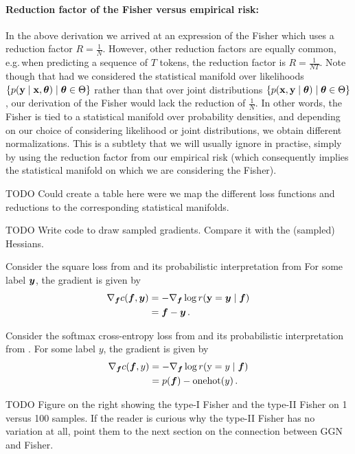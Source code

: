 \paragraph{Reduction factor of the Fisher versus empirical risk:}
In the above derivation we arrived at an expression of the Fisher which uses a reduction factor $R = \frac{1}{N}$.
However, other reduction factors are equally common, e.g.\,when predicting a sequence of $T$ tokens, the reduction factor is $R = \frac{1}{NT}$.
Note though that had we considered the statistical manifold over likelihoods $\{ p({\mathbf{y}} \mid {\mathbf{x}}, {\bm{\theta}}) \mid {\bm{\theta}} \in \Theta \}$ rather than that over joint distributions $\{ p({\mathbf{x}}, {\mathbf{y}} \mid {\bm{\theta}}) \mid {\bm{\theta}} \in \Theta \}$, our derivation of the Fisher would lack the reduction of $\frac{1}{N}$.
In other words, the Fisher is tied to a statistical manifold over probability densities, and depending on our choice of considering likelihood or joint distributions, we obtain different normalizations.
This is a subtlety that we will usually ignore in practise, simply by using the reduction factor from our empirical risk (which consequently implies the statistical manifold on which we are considering the Fisher).

TODO Could create a table here were we map the different loss functions and reductions to the corresponding statistical manifolds.

TODO Write code to draw sampled gradients.
Compare it with the (sampled) Hessians.

\begin{example}
  Consider the square loss from  and its probabilistic interpretation from 
  For some label ${\bm{y}}$, the gradient is given by
  \begin{align*}
    \nabla_{{\bm{f}}} c({\bm{f}}, {\bm{y}})
    &=
      - \nabla_{{\bm{f}}} \log r({\mathbf{y}} ={\bm{y}} \mid {\bm{f}})
    \\
    &=
      {\bm{f}} - {\bm{y}}\,.
  \end{align*}
\end{example}

\begin{example}
  Consider the softmax cross-entropy loss from  and its probabilistic interpretation from . For some label $y$, the gradient is given by
  \begin{align*}
    \nabla_{{\bm{f}}} c({\bm{f}}, y)
    &=
      - \nabla_{{\bm{f}}} \log r({\textnormal{y}} = y \mid {\bm{f}})
    \\
    &=
      p({\bm{f}}) - \mathrm{onehot}(y)\,.
  \end{align*}
\end{example}

TODO Figure on the right showing the type-I Fisher and the type-II Fisher on 1 versus 100 samples.
If the reader is curious why the type-II Fisher has no variation at all, point them to the next section on the connection between GGN and Fisher.

